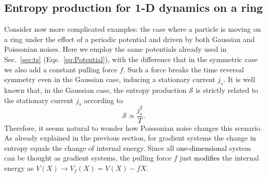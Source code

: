 \documentclass[12pt]{iopart}
\newcommand{\lx} {\left}
\newcommand{\rx} {\right}
\newcommand{\cS} {\mathcal{S}}
\newcommand{\cT} {\mathcal{T}}
\begin{document}
\subsection{Entropy production for 1-D dynamics on a ring}
Consider now more complicated examples: the case where a particle is moving on a ring under the effect of a periodic potential and driven by both Gaussian and Poissonian noises. Here we employ the same potentials already used in Sec.~\ref{sec:ts} (Eqs.~\ref{eq:Potential}), with the difference that in the symmetric case we also add a constant pulling force $f$. Such a force breaks the time reversal symmetry even in the Gaussian case, inducing a stationary current $j_s$. It is well known that, in the Gaussian case, the entropy production $\cS$ is strictly related to the stationary current $j_s$ according to~\textcolor{black}{\cite{Sekimoto2010,seifertrev,cocconi2020entropy}}
\begin{equation}
\cS\propto \frac{j_s^2}{T}.
\end{equation}
Therefore, it seems natural to wonder how Poissonian noise changes this scenario. As already explained in the previous section, for gradient systems the change in entropy equals the change of internal energy. Since all \textcolor{black}{one-dimensional} system can be thought as gradient systems, the pulling force $f$ just \textcolor{black}{modifies} the internal energy as
$V(X)\to V_f(X)=V(X)-fX$.
\end{document}
